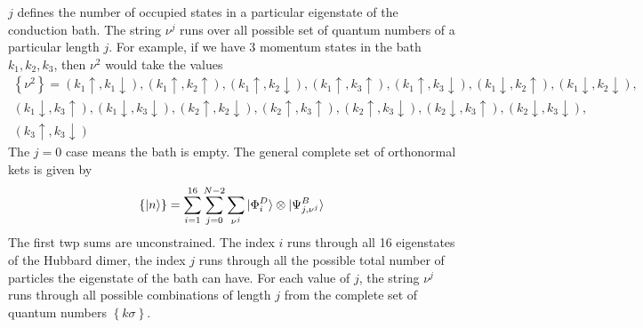 \documentclass[12pt]{article}
\numberwithin{equation}{section}
\begin{document}
$j$ defines the number of occupied states in a particular eigenstate of the conduction bath. The string $\nu^j$ runs over all possible set of quantum numbers of a particular length $j$. For example, if we have 3 momentum states in the bath $k_1, k_2, k_3$, then $\nu^2$ would take the values
\begin{equation}\begin{aligned}
	\left\{\nu^2\right\} = \left(k_1 \uparrow, k_1 \downarrow\right),\left(k_1 \uparrow, k_2 \uparrow\right),\left(k_1 \uparrow, k_2 \downarrow\right),\left(k_1 \uparrow, k_3 \uparrow\right),\left(k_1 \uparrow, k_3 \downarrow\right),\left(k_1 \downarrow, k_2 \uparrow\right),\left(k_1 \downarrow, k_2 \downarrow\right),\\
	\left(k_1 \downarrow, k_3 \uparrow\right),\left(k_1 \downarrow, k_3 \downarrow\right),\left(k_2 \uparrow, k_2 \downarrow\right),\left(k_2 \uparrow, k_3 \uparrow\right),\left(k_2 \uparrow, k_3 \downarrow\right),\left(k_2 \downarrow, k_3 \uparrow\right),\left(k_2 \downarrow, k_3 \downarrow\right),\\
\left(k_3 \uparrow, k_3 \downarrow\right)
\end{aligned}\end{equation}
The $j=0$ case means the bath is empty.
The general complete set of orthonormal kets is given by
\begin{equation}\begin{aligned}
	\left\{ \ket{n} \right\} = \sum_{i=1}^{16}\sum_{j=0}^{N-2}\sum_{\nu^j}\ket{\Phi^D_i}\otimes \ket{\Psi^B_{j, \nu^j}}
\end{aligned}\end{equation}
The first twp sums are unconstrained. The index $i$ runs through all 16 eigenstates of the Hubbard dimer, the index $j$ runs through all the possible total number of particles the eigenstate of the bath can have. For each value of $j$, the string $\nu^j$ runs through all possible combinations of length $j$ from the complete set of quantum numbers $\left\{ k\sigma \right\} $.
		
\end{document}
